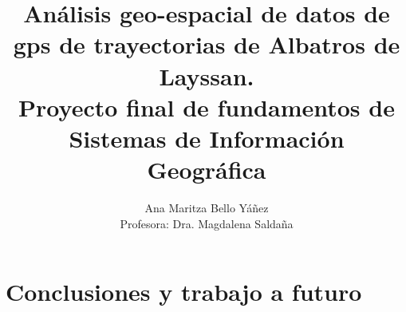 \documentclass[a4paper, 11pt]{article}
\title{ Análisis geo-espacial de datos de gps de trayectorias de Albatros de
Layssan. \\
Proyecto final de fundamentos de Sistemas de Información Geográfica \\
}
\author{Ana Maritza Bello Yáñez \\ Profesora: Dra. Magdalena Saldaña}
\begin{document}
\maketitle
\tableofcontents









\section{Conclusiones y trabajo a futuro}


\pagebreak
 

\end{document}
